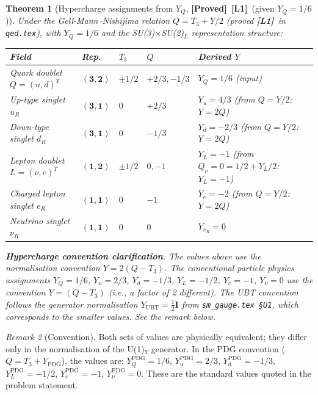 \documentclass[12pt,a4paper]{article}
\newtheorem{theorem}{Theorem}[section]
\theoremstyle{definition}
\theoremstyle{remark}
\newtheorem{remark}[theorem]{Remark}
\newcommand{\PROVED}{\textbf{[Proved]}}
\newcommand{\Lone}{\textbf{[L1]}}
\begin{document}
\begin{theorem}[Hypercharge assignments from $Y_Q$, \PROVED\ \Lone\ (given $Y_Q = 1/6$)]
\label{thm:assignments}
Under the Gell-Mann--Nishijima relation $Q = T_3 + Y/2$ (proved \Lone\ in
\texttt{qed.tex}), with $Y_Q = 1/6$ and the SU(3)$\times$SU(2)$_L$ representation
structure:

\begin{center}
\begin{tabular}{llllll}
\toprule
\textbf{Field} & \textbf{Rep.} & $T_3$ & $Q$ & \textbf{Derived} $Y$ \\
\midrule
Quark doublet $Q = (u,d)^T$ & $(\mathbf{3},\mathbf{2})$ &
  $\pm 1/2$ & $+2/3, -1/3$ & $Y_Q = 1/6$ (input) \\
Up-type singlet $u_R$ & $(\mathbf{3},\mathbf{1})$ &
  $0$ & $+2/3$ & $Y_u = 4/3$ (from $Q = Y/2$: $Y = 2Q$) \\
Down-type singlet $d_R$ & $(\mathbf{3},\mathbf{1})$ &
  $0$ & $-1/3$ & $Y_d = -2/3$ (from $Q = Y/2$: $Y = 2Q$) \\
\midrule
Lepton doublet $L = (\nu,e)^T$ & $(\mathbf{1},\mathbf{2})$ &
  $\pm 1/2$ & $0, -1$ & $Y_L = -1$ (from $Q_\nu = 0 = 1/2 + Y_L/2$: $Y_L = -1$) \\
Charged lepton singlet $e_R$ & $(\mathbf{1},\mathbf{1})$ &
  $0$ & $-1$ & $Y_e = -2$ (from $Q = Y/2$: $Y = 2Q$) \\
Neutrino singlet $\nu_R$ & $(\mathbf{1},\mathbf{1})$ &
  $0$ & $0$ & $Y_{\nu_R} = 0$ \\
\bottomrule
\end{tabular}
\end{center}

\textbf{Hypercharge convention clarification}: The values above use the
\emph{normalisation convention} $Y = 2(Q - T_3)$.  The conventional
particle physics assignments $Y_Q = 1/6$, $Y_u = 2/3$, $Y_d = -1/3$,
$Y_L = -1/2$, $Y_e = -1$, $Y_\nu = 0$ use the convention $Y = (Q - T_3)$
(i.e., a factor of 2 different).  The UBT convention follows the
generator normalisation $Y_{\mathrm{UBT}} = \frac{1}{2}\mathbf{I}$ from
\texttt{sm\_gauge.tex §U1}, which corresponds to the smaller values.
See the remark below.
\end{theorem}

\begin{remark}[Convention]
Both sets of values are physically equivalent; they differ only in the
normalisation of the U(1)$_Y$ generator.  In the PDG convention
($Q = T_3 + Y_{\mathrm{PDG}}$), the values are:
$Y_Q^{\mathrm{PDG}} = 1/6$,
$Y_u^{\mathrm{PDG}} = 2/3$,
$Y_d^{\mathrm{PDG}} = -1/3$,
$Y_L^{\mathrm{PDG}} = -1/2$,
$Y_e^{\mathrm{PDG}} = -1$,
$Y_\nu^{\mathrm{PDG}} = 0$.
These are the standard values quoted in the problem statement.
\end{remark}
\end{document}
